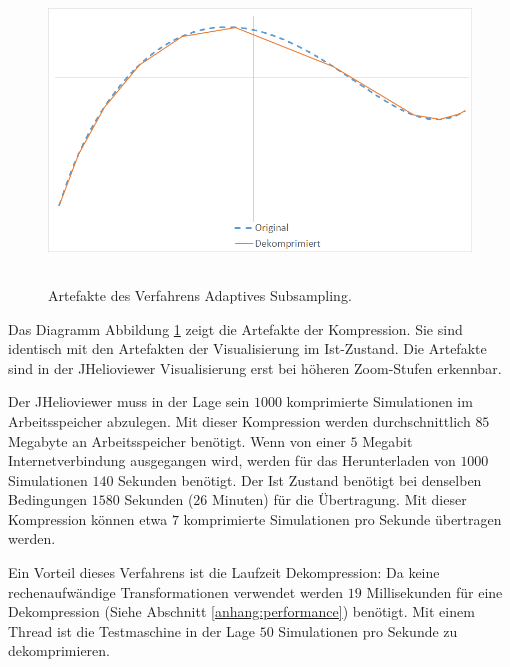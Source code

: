 \begin{figure}[!htbp]
	\center
	\includegraphics[width=1\textwidth,height=8cm,keepaspectratio]{./pictures/resultate/loesung0/loesung0_artefakte.png}
	\caption{Artefakte des Verfahrens Adaptives Subsampling.}
	\label{resultate:loesung0:artefakte}
\end{figure}
Das Diagramm Abbildung \ref{resultate:loesung0:artefakte} zeigt die Artefakte der Kompression. Sie sind identisch mit den Artefakten der Visualisierung im Ist-Zustand. Die Artefakte sind in der JHelioviewer Visualisierung erst bei höheren Zoom-Stufen erkennbar.

Der JHelioviewer muss in der Lage sein $1000$ komprimierte Simulationen im Arbeitsspeicher abzulegen. Mit dieser Kompression werden durchschnittlich $85$ Megabyte an Arbeitsspeicher benötigt. Wenn von einer $5$ Megabit Internetverbindung ausgegangen wird, werden für das Herunterladen von $1000$ Simulationen $140$ Sekunden benötigt. Der Ist Zustand benötigt bei denselben Bedingungen $1580$ Sekunden ($26$ Minuten) für die Übertragung. Mit dieser Kompression können etwa $7$ komprimierte Simulationen pro Sekunde übertragen werden. 

Ein Vorteil dieses Verfahrens ist die Laufzeit Dekompression: Da keine rechenaufwändige Transformationen verwendet werden $19$ Millisekunden für eine Dekompression (Siehe Abschnitt \ref{anhang:performance}) benötigt. Mit einem Thread ist die Testmaschine in der Lage $50$ Simulationen pro Sekunde zu dekomprimieren.